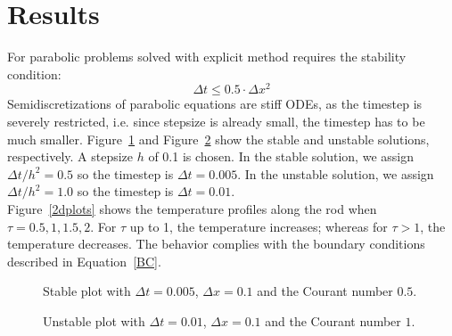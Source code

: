 \documentclass{article}
\begin{document}
\section{Results}

For parabolic problems solved with explicit method requires the stability condition:
\begin{equation}
    \Delta t \leq 0.5 \cdot \Delta x^2
\end{equation}
Semidiscretizations of parabolic equations are stiff ODEs, as the timestep is severely restricted, i.e. since stepsize is already small, the timestep has to be much smaller. Figure~\ref{stable_solution} and Figure~\ref{unstable_solution} show the stable and unstable solutions, respectively. A stepsize $h$ of 0.1 is chosen. In the stable solution, we assign $\Delta t / h^2 = 0.5$ so the timestep is $\Delta t =  0.005$. In the unstable solution, we assign $\Delta t / h^2 = 1.0$ so the timestep is $\Delta t =  0.01$.  \\ 

\noindent
Figure~\ref{2dplots} shows the temperature profiles along the rod when $\tau = 0.5, 1, 1.5, 2$. For $\tau$ up to 1, the temperature increases; whereas for $\tau > 1$, the temperature decreases. The behavior complies with the boundary conditions described in Equation~\ref{BC}.

\begin{figure}
  \centering
  \caption{Stable plot with $\Delta t = 0.005$, $\Delta x = 0.1$ and the
    Courant number $0.5$.}
    \label{stable_solution}
\end{figure}

\begin{figure}
  \centering
  \caption{Unstable plot with $\Delta t = 0.01$, $\Delta x = 0.1$ and the
    Courant number $1$.}
    \label{unstable_solution}
\end{figure}
\end{document}
